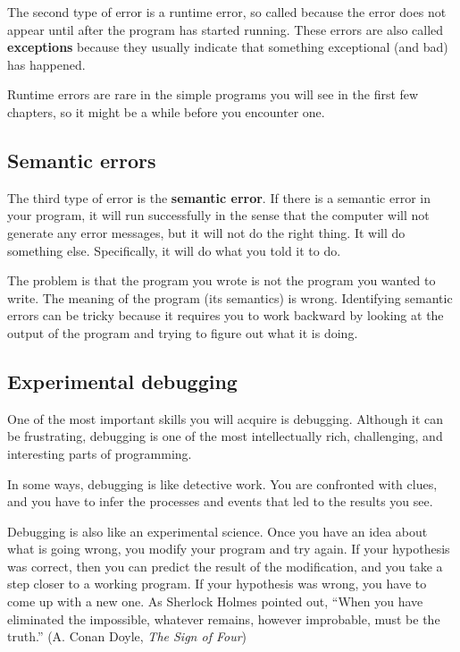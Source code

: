 \documentclass[10pt]{book}
\begin{document}
The second type of error is a runtime error, so called because the
error does not appear until after the program has started running.
These errors are also called {\bf exceptions} because they usually
indicate that something exceptional (and bad) has happened.

Runtime errors are rare in the simple programs you will see in the
first few chapters, so it might be a while before you encounter one.


\subsection{Semantic errors}

The third type of error is the {\bf semantic error}.  If there is a
semantic error in your program, it will run successfully in the sense
that the computer will not generate any error messages, but it will
not do the right thing.  It will do something else.  Specifically, it
will do what you told it to do.

The problem is that the program you wrote is not the program you
wanted to write.  The meaning of the program (its semantics) is wrong.
Identifying semantic errors can be tricky because it requires you to work
backward by looking at the output of the program and trying to figure
out what it is doing.

\subsection{Experimental debugging}

One of the most important skills you will acquire is debugging.
Although it can be frustrating, debugging is one of the most
intellectually rich, challenging, and interesting parts of
programming.

In some ways, debugging is like detective work.  You are confronted
with clues, and you have to infer the processes and events that led
to the results you see.

Debugging is also like an experimental science.  Once you have an idea
about what is going wrong, you modify your program and try again.  If
your hypothesis was correct, then you can predict the result of the
modification, and you take a step closer to a working program.  If
your hypothesis was wrong, you have to come up with a new one.  As
Sherlock Holmes pointed out, ``When you have eliminated the
impossible, whatever remains, however improbable, must be the truth.''
(A. Conan Doyle, {\em The Sign of Four})
\end{document}
